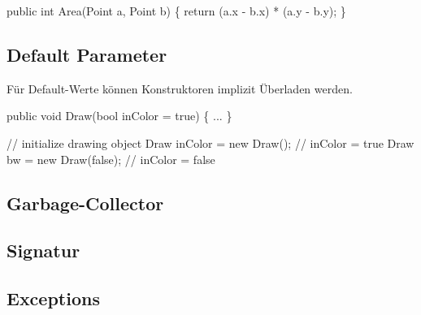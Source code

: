 \documentclass[
  9pt,
  a4paperpaper,
  DIV=11]{scrartcl}
\newenvironment{Shaded}{}{}
\newcommand{\CommentTok}[1]{\textcolor[rgb]{0.42,0.45,0.49}{#1}}
\newcommand{\DataTypeTok}[1]{\textcolor[rgb]{0.84,0.23,0.29}{#1}}
\newcommand{\FunctionTok}[1]{\textcolor[rgb]{0.44,0.26,0.76}{#1}}
\newcommand{\KeywordTok}[1]{\textcolor[rgb]{0.84,0.23,0.29}{#1}}
\newcommand{\NormalTok}[1]{\textcolor[rgb]{0.14,0.16,0.18}{#1}}
\newcommand{\OperatorTok}[1]{\textcolor[rgb]{0.14,0.16,0.18}{#1}}
\numberwithin{equation}{section}
\begin{document}
\begin{multicols}{2}
\begin{tcolorbox}
\begin{tcolorbox}
\begin{tcolorbox}
\begin{tcolorbox}
\begin{tcolorbox}
\begin{tcolorbox}
\begin{Shaded}
\begin{Highlighting}[]
\KeywordTok{public} \DataTypeTok{int} \FunctionTok{Area}\OperatorTok{(}\NormalTok{Point a}\OperatorTok{,}\NormalTok{ Point b}\OperatorTok{)} \OperatorTok{\{}
  \KeywordTok{return} \OperatorTok{(}\NormalTok{a}\OperatorTok{.}\FunctionTok{x} \OperatorTok{{-}}\NormalTok{ b}\OperatorTok{.}\FunctionTok{x}\OperatorTok{)} \OperatorTok{*} \OperatorTok{(}\NormalTok{a}\OperatorTok{.}\FunctionTok{y} \OperatorTok{{-}}\NormalTok{ b}\OperatorTok{.}\FunctionTok{y}\OperatorTok{);}
\OperatorTok{\}}
\end{Highlighting}
\end{Shaded}

\hypertarget{default-parameter}{%
\subsection{Default Parameter}\label{default-parameter}}

Für Default-Werte können Konstruktoren implizit Überladen werden.

\begin{Shaded}
\begin{Highlighting}[]
\KeywordTok{public} \DataTypeTok{void} \FunctionTok{Draw}\OperatorTok{(}\DataTypeTok{bool}\NormalTok{ inColor }\OperatorTok{=} \KeywordTok{true}\OperatorTok{)} \OperatorTok{\{} \OperatorTok{...} \OperatorTok{\}}

\CommentTok{// initialize drawing object}
\NormalTok{Draw inColor }\OperatorTok{=} \KeywordTok{new} \FunctionTok{Draw}\OperatorTok{();}    \CommentTok{// inColor = true}
\NormalTok{Draw bw }\OperatorTok{=} \KeywordTok{new} \FunctionTok{Draw}\OperatorTok{(}\KeywordTok{false}\OperatorTok{);}    \CommentTok{// inColor = false}
\end{Highlighting}
\end{Shaded}

\hypertarget{garbage-collector}{%
\subsection{Garbage-Collector}\label{garbage-collector}}

\hypertarget{signatur}{%
\subsection{Signatur}\label{signatur}}

\hypertarget{exceptions}{%
\subsection{Exceptions}\label{exceptions}}


\end{tcolorbox}
\end{tcolorbox}
\end{tcolorbox}
\end{tcolorbox}
\end{tcolorbox}
\end{tcolorbox}
\end{multicols}
\end{document}
